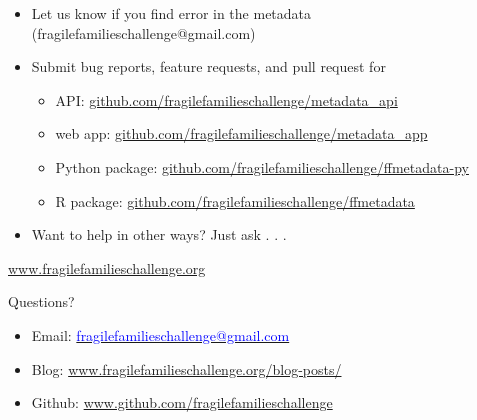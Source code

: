 \documentclass{beamer}
\begin{document}
\begin{frame}

\begin{itemize}
\item Let us know if you find error in the metadata (fragilefamilieschallenge@gmail.com)\pause
\item Submit bug reports, feature requests, and pull request for 
\begin{itemize}
\item API: \url{github.com/fragilefamilieschallenge/metadata_api}
\item web app: \url{github.com/fragilefamilieschallenge/metadata_app}
\item Python package: \url{github.com/fragilefamilieschallenge/ffmetadata-py}
\item R package: \url{github.com/fragilefamilieschallenge/ffmetadata} \pause
\end{itemize}
\item Want to help in other ways?  Just ask . . .
\end{itemize}

\end{frame}
\begin{frame}

\begin{center}
\Large{\textcolor{blue}{\href{http://www.fragilefamilieschallenge.org}{www.fragilefamilieschallenge.org}}} 
\end{center}

\vfill

Questions? 
\begin{itemize}
\item Email: \href{mailto:fragilefamilieschallenge@gmail.com}{\textcolor{blue}{fragilefamilieschallenge@gmail.com}} 
\item Blog: \small{\textcolor{blue}{\href{http://www.fragilefamilieschallenge.org/blog-posts/}{www.fragilefamilieschallenge.org/blog-posts/}}}
\item Github: \small{\textcolor{blue}{\href{http://github.com/fragilefamilieschallenge}{www.github.com/fragilefamilieschallenge}}}
\end{itemize}

\end{frame}
\end{document}

